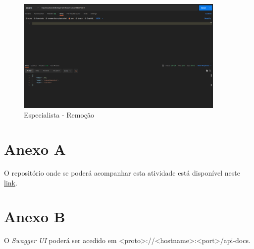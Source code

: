 \documentclass[12pt,a4paper,final]{article}
\begin{document}
    \begin{figure}[H]
        \centering
        \includegraphics[width=0.9\textwidth]{del_expert}
        \caption{Especialista - Remoção}
        \label{fig:del_expert}
    \end{figure}

    \newpage
    \appendix
    \section*{Anexo A}
    O repositório onde se poderá acompanhar esta atividade está disponível neste \underline{\href{https://github.com/2100562/MiniProj3}{link}}.

    \newpage
    \section*{Anexo B}
    O \textit{Swagger UI} poderá ser acedido em <proto>://<hostname>:<port>/api-docs.
\end{document}
